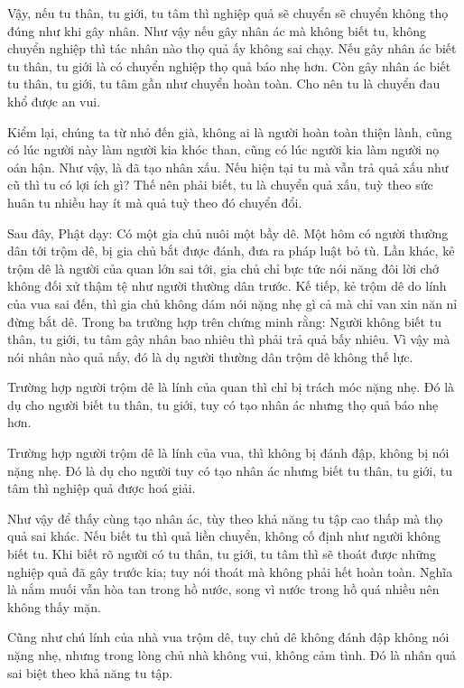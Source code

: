 \documentclass[
  12pt,
  oneside]{book}
\begin{document}
Vậy, nếu tu thân, tu giới, tu tâm thì nghiệp quả sẽ chuyển sẽ chuyển không thọ đúng như khi gây nhân. Như vậy nếu gây nhân ác mà không biết tu, không chuyển nghiệp thì tác nhân nào thọ quả ấy không sai chạy. Nếu gây nhân ác biết tu thân, tu giới là có chuyển nghiệp thọ quả báo nhẹ hơn. Còn gây nhân ác biết tu thân, tu giới, tu tâm gần như chuyển hoàn toàn. Cho nên tu là chuyển đau khổ được an vui.

Kiểm lại, chúng ta từ nhỏ đến già, không ai là người hoàn toàn thiện lành, cũng có lúc người này làm người kia khóc than, cũng có lúc người kia làm người nọ oán hận. Như vậy, là đã tạo nhân xấu. Nếu hiện tại tu mà vẫn trả quả xấu như cũ thì tu có lợi ích gì? Thế nên phải biết, tu là chuyển quả xấu, tuỳ theo sức huân tu nhiều hay ít mà quả tuỳ theo đó chuyển đổi.

Sau đây, Phật dạy: Có một gia chủ nuôi một bầy dê. Một hôm có người thường dân tới trộm dê, bị gia chủ bắt được đánh, đưa ra pháp luật bỏ tù. Lần khác, kẻ trộm dê là người của quan lớn sai tới, gia chủ chỉ bực tức nói năng đôi lời chớ không đối xử thậm tệ như người thường dân trước. Kế tiếp, kẻ trộm dê do lính của vua sai đến, thì gia chủ không dám nói nặng nhẹ gì cả mà chỉ van xin năn nỉ đừng bắt dê. Trong ba trường hợp trên chứng minh rằng: Người không biết tu thân, tu giới, tu tâm gây nhân bao nhiêu thì phải trả quả bấy nhiêu. Vì vậy mà nói nhân nào quả nấy, đó là dụ người thường dân trộm dê không thế lực.

Trường hợp người trộm dê là lính của quan thì chỉ bị trách móc nặng nhẹ. Đó là dụ cho người biết tu thân, tu giới, tuy có tạo nhân ác nhưng thọ quả báo nhẹ hơn.

Trường hợp người trộm dê là lính của vua, thì không bị đánh đập, không bị nói nặng nhẹ. Đó là dụ cho người tuy có tạo nhân ác nhưng biết tu thân, tu giới, tu tâm thì nghiệp quả được hoá giải.

Như vậy để thấy cùng tạo nhân ác, tùy theo khả năng tu tập cao thấp mà thọ quả sai khác. Nếu biết tu thì quả liền chuyển, không cố định như người không biết tu. Khi biết rõ người có tu thân, tu giới, tu tâm thì sẽ thoát được những nghiệp quả đã gây trước kia; tuy nói thoát mà không phải hết hoàn toàn. Nghĩa là nắm muối vẫn hòa tan trong hồ nước, song vì nước trong hồ quá nhiều nên không thấy mặn.

Cũng như chú lính của nhà vua trộm dê, tuy chủ dê không đánh đập không nói nặng nhẹ, nhưng trong lòng chủ nhà không vui, không cảm tình. Đó là nhân quả sai biệt theo khả năng tu tập.
\end{document}
